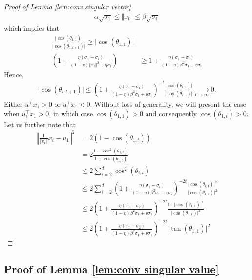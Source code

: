 \begin{proof}[Proof of Lemma \ref{lem:conv singular vector}]
\begin{align*}
         \alpha \sqrt{\sigma_1} \le \Vert x_t \Vert \le  \beta  \sqrt{\sigma_1}
    \end{align*} 
    which implies that 
    \begin{align*}
        \frac{\vert \cos(\theta_{1, 1}) \vert}{\vert \cos(\theta_{1, t+1}) \vert} \ge \vert \cos(\theta_{1, 1}) \vert \\
        \left(1 + \frac{ \eta (\sigma_1 - \sigma_i) }{ (1-\eta) \Vert x_t \Vert^2 + \eta \sigma_i}  \right) & \ge 1 + \frac{\eta (\sigma_1 - \sigma_i)}{(1-\eta) \beta^2 \sigma_1   + \eta \sigma_i }
    \end{align*}
    Hence, 
    \begin{align*}
        \vert \cos(\theta_{i, t+1}) \vert \le \left( 1 + \frac{\eta (\sigma_1 - \sigma_i)}{(1-\eta) \beta^2 \sigma_1   + \eta \sigma_i} \right)^{-t} \frac{\vert \cos(\theta_{i, 1}) \vert}{\vert \cos(\theta_{1, 1}) \vert} \underset{t \to \infty}{\longrightarrow} 0. 
    \end{align*}
    Either $u_1^\top x_1 > 0$ or $u_1^\top x_1 <0$. Without loss of generality, we will present the case when $u_1^\top x_1 > 0$, in which case $\cos(\theta_{1,1}) > 0$ and consequently $\cos(\theta_{1, t}) >0$.  Let us further note that
    \begin{align*}
        \left\Vert \frac{1}{\Vert x_t \Vert } x_t  - u_1 \right\Vert^2 & = 2 (1 - \cos(\theta_{1,t})) \\
       & =  2 \frac{1-\cos^2(\theta_{1,t})}{1 + \cos(\theta_{1,t})} \\
       & \le 2 \sum_{i=2}^d \cos^2(\theta_{i,t}) \\
       & \le 2 \sum_{i=2}^d  \left( 1 + \frac{\eta (\sigma_1 - \sigma_i)}{(1-\eta) \beta^2 \sigma_1   + \eta \sigma_i} \right)^{-2t} \frac{\vert \cos(\theta_{i, 1}) \vert^2}{\vert \cos(\theta_{1, 1}) \vert^2} \\
       & \le 2 \left( 1 + \frac{\eta (\sigma_1 - \sigma_2)}{(1-\eta) \beta^2 \sigma_1   + \eta \sigma_2} \right)^{-2t} \frac{1 - \vert \cos(\theta_{1, 1}) \vert^2}{\vert \cos(\theta_{1, 1}) \vert^2} \\ 
       & \le 2 \left( 1 + \frac{\eta (\sigma_1 - \sigma_2)}{(1-\eta) \beta^2 \sigma_1   + \eta \sigma_2} \right)^{-2t} \vert \tan(\theta_{1, 1}) \vert^2
    \end{align*}
\end{proof}


\subsection{Proof of Lemma \ref{lem:conv singular value}}\label{sec:proof conv singular value}

